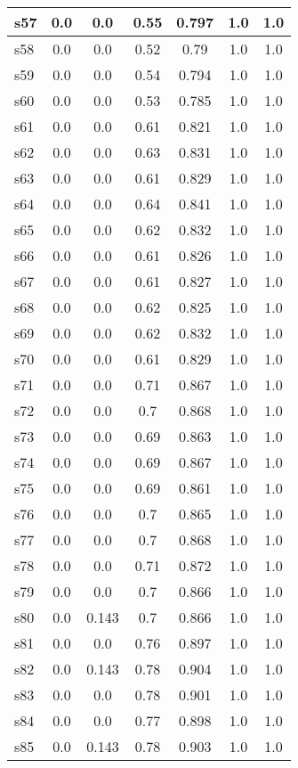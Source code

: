 \documentclass{article}
\begin{document}
\begin{tabular}{|l|c|c|c|c|c|c|}
\hline
s57 &0.0 & 0.0 & 0.55 & 0.797 & 1.0 & 1.0\\
\hline
s58 &0.0 & 0.0 & 0.52 & 0.79 & 1.0 & 1.0\\
\hline
s59 &0.0 & 0.0 & 0.54 & 0.794 & 1.0 & 1.0\\
\hline
s60 &0.0 & 0.0 & 0.53 & 0.785 & 1.0 & 1.0\\
\hline
s61 &0.0 & 0.0 & 0.61 & 0.821 & 1.0 & 1.0\\
\hline
s62 &0.0 & 0.0 & 0.63 & 0.831 & 1.0 & 1.0\\
\hline
s63 &0.0 & 0.0 & 0.61 & 0.829 & 1.0 & 1.0\\
\hline
s64 &0.0 & 0.0 & 0.64 & 0.841 & 1.0 & 1.0\\
\hline
s65 &0.0 & 0.0 & 0.62 & 0.832 & 1.0 & 1.0\\
\hline
s66 &0.0 & 0.0 & 0.61 & 0.826 & 1.0 & 1.0\\
\hline
s67 &0.0 & 0.0 & 0.61 & 0.827 & 1.0 & 1.0\\
\hline
s68 &0.0 & 0.0 & 0.62 & 0.825 & 1.0 & 1.0\\
\hline
s69 &0.0 & 0.0 & 0.62 & 0.832 & 1.0 & 1.0\\
\hline
s70 &0.0 & 0.0 & 0.61 & 0.829 & 1.0 & 1.0\\
\hline
s71 &0.0 & 0.0 & 0.71 & 0.867 & 1.0 & 1.0\\
\hline
s72 &0.0 & 0.0 & 0.7 & 0.868 & 1.0 & 1.0\\
\hline
s73 &0.0 & 0.0 & 0.69 & 0.863 & 1.0 & 1.0\\
\hline
s74 &0.0 & 0.0 & 0.69 & 0.867 & 1.0 & 1.0\\
\hline
s75 &0.0 & 0.0 & 0.69 & 0.861 & 1.0 & 1.0\\
\hline
s76 &0.0 & 0.0 & 0.7 & 0.865 & 1.0 & 1.0\\
\hline
s77 &0.0 & 0.0 & 0.7 & 0.868 & 1.0 & 1.0\\
\hline
s78 &0.0 & 0.0 & 0.71 & 0.872 & 1.0 & 1.0\\
\hline
s79 &0.0 & 0.0 & 0.7 & 0.866 & 1.0 & 1.0\\
\hline
s80 &0.0 & 0.143 & 0.7 & 0.866 & 1.0 & 1.0\\
\hline
s81 &0.0 & 0.0 & 0.76 & 0.897 & 1.0 & 1.0\\
\hline
s82 &0.0 & 0.143 & 0.78 & 0.904 & 1.0 & 1.0\\
\hline
s83 &0.0 & 0.0 & 0.78 & 0.901 & 1.0 & 1.0\\
\hline
s84 &0.0 & 0.0 & 0.77 & 0.898 & 1.0 & 1.0\\
\hline
s85 &0.0 & 0.143 & 0.78 & 0.903 & 1.0 & 1.0\\

\end{tabular}
\end{document}
